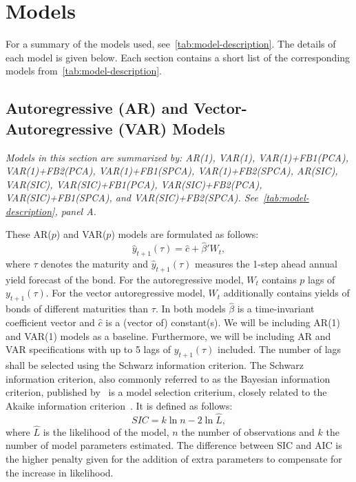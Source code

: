 \section{Models}
\label{sec:models}
For a summary of the models used, see~\cref{tab:model-description}. 
The details of each model is given below.
Each section contains a short list of the corresponding models from~\cref{tab:model-description}.
\subsection{Autoregressive (AR) and Vector-Autoregressive (VAR) Models}
\label{sec:arvar}
\textit{Models in this section are summarized by: AR(1), VAR(1), VAR(1)+FB1(PCA), VAR(1)+FB2(PCA), VAR(1)+FB1(SPCA), VAR(1)+FB2(SPCA), AR(SIC), VAR(SIC), VAR(SIC)+FB1(PCA), VAR(SIC)+FB2(PCA), VAR(SIC)+FB1(SPCA), and VAR(SIC)+FB2(SPCA). See~\cref{tab:model-description}, panel A.}

These AR($p$) and VAR($p$) models are formulated as follows:
\begin{equation}
	\hat{y}_{t+1}(\tau) = \hat{c} + \hat{\beta}' W_t,
\end{equation}
where $\tau$ denotes the maturity and $\hat{y}_{t+1}(\tau)$ measures the 1-step ahead annual yield forecast of the bond. 
For the autoregressive model, $W_t$ contains $p$ lags of $y_{t+1}(\tau)$. For the vector autoregressive model, $W_t$ additionally contains yields of bonds of different maturities than $\tau$. 
In both models $\hat{\beta}$ is a time-invariant coefficient vector and $\hat{c}$ is a (vector of) constant(s). 
We will be including AR(1) and VAR(1) models as a baseline. 
Furthermore, we will be including AR and VAR specifications with up to 5 lags of $y_{t+1}(\tau)$ included. 
The number of lags shall be selected using the Schwarz information criterion.
The Schwarz information criterion, also commonly referred to as the Bayesian information criterion, published by~\textcite[hereafter SIC]{schwarz_estimating_1978} is a model selection criterium, closely related to the Akaike information criterion~\parencite[hereafter AIC]{akaike_new_1974}. 
It is defined as follows:
\begin{equation}
	SIC = k\ln{n} - 2\ln{\hat{L}},
\end{equation}
where $\hat{L}$ is the likelihood of the model, $n$ the number of observations and $k$ the number of model parameters estimated. The difference between SIC and AIC is the higher penalty given for the addition of extra parameters to compensate for the increase in likelihood.

